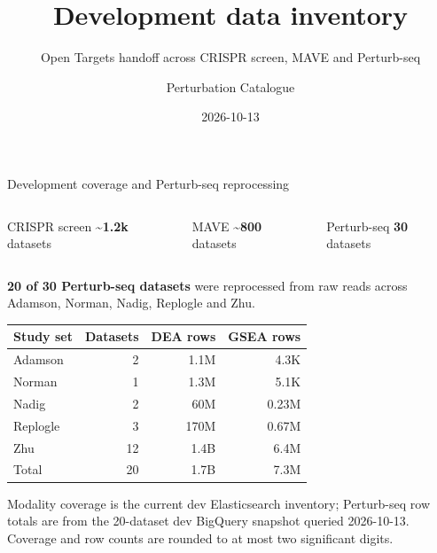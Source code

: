 \documentclass[handout,aspectratio=169]{beamer}
\title{Development data inventory}
\subtitle{Open Targets handoff across CRISPR screen, MAVE and Perturb-seq}
\date{2026-10-13}
\author{Perturbation Catalogue}
\institute{Development inventory}
\begin{document}
\begin{frame}
  \titlepage
\end{frame}

\begin{frame}{Development coverage and Perturb-seq reprocessing}
  \begin{columns}[T,onlytextwidth]
      \begin{block}{CRISPR screen}
        \centering\large\textbf{\textasciitilde1.2k} datasets
      \end{block}
      \begin{block}{MAVE}
        \centering\large\textbf{\textasciitilde800} datasets
      \end{block}
      \begin{block}{Perturb-seq}
        \centering\large\textbf{30} datasets
      \end{block}
  \end{columns}
  \vspace{-0.1em}
  \footnotesize \textbf{20 of 30 Perturb-seq datasets} were reprocessed from raw reads across Adamson, Norman, Nadig, Replogle and Zhu.\\[-0.1em]
  \scriptsize
  \begin{tabularx}{\textwidth}{@{}>{\raggedright\arraybackslash}Xr r r@{}}
    \toprule
    \textbf{Study set} & \textbf{Datasets} & \textbf{DEA rows} & \textbf{GSEA rows} \\
    \midrule
    Adamson & 2 & 1.1M & 4.3K \\
    Norman & 1 & 1.3M & 5.1K \\
    Nadig & 2 & 60M & 0.23M \\
    Replogle & 3 & 170M & 0.67M \\
    Zhu & 12 & 1.4B & 6.4M \\
    \midrule
    Total & 20 & 1.7B & 7.3M \\
    \bottomrule
  \end{tabularx}
  \vfill
  \scriptsize Modality coverage is the current dev Elasticsearch inventory; Perturb-seq row totals are from the 20-dataset dev BigQuery snapshot queried 2026-10-13. Coverage and row counts are rounded to at most two significant digits.
\end{frame}
\end{document}

